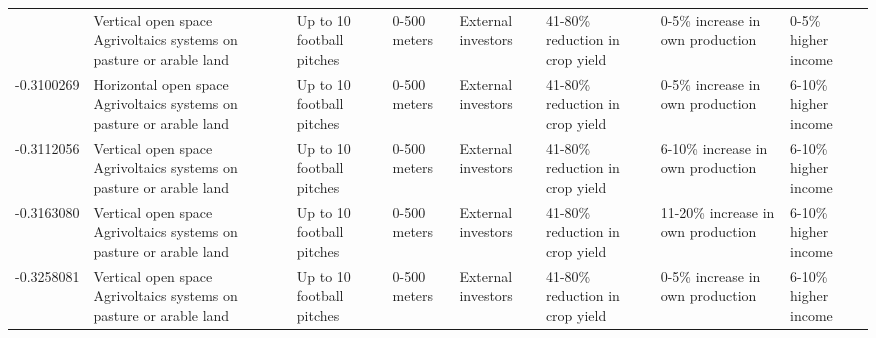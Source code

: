 \begin{table}
\begin{tabular}[t]{rlllllll}
\addlinespace
-0.3035904 & Vertical open space Agrivoltaics
systems on pasture or arable land & Up to 10 football pitches & 0-500 meters & External investors & 41-80\% reduction in crop yield & 0-5\% increase in own production & 0-5\% higher income\\
-0.3100269 & Horizontal open space Agrivoltaics
systems on pasture or arable land & Up to 10 football pitches & 0-500 meters & External investors & 41-80\% reduction in crop yield & 0-5\% increase in own production & 6-10\% higher income\\
-0.3112056 & Vertical open space Agrivoltaics
systems on pasture or arable land & Up to 10 football pitches & 0-500 meters & External investors & 41-80\% reduction in crop yield & 6-10\% increase in own production & 6-10\% higher income\\
-0.3163080 & Vertical open space Agrivoltaics
systems on pasture or arable land & Up to 10 football pitches & 0-500 meters & External investors & 41-80\% reduction in crop yield & 11-20\% increase in own production & 6-10\% higher income\\
-0.3258081 & Vertical open space Agrivoltaics
systems on pasture or arable land & Up to 10 football pitches & 0-500 meters & External investors & 41-80\% reduction in crop yield & 0-5\% increase in own production & 6-10\% higher income\\
\bottomrule
\end{tabular}
\end{table}
